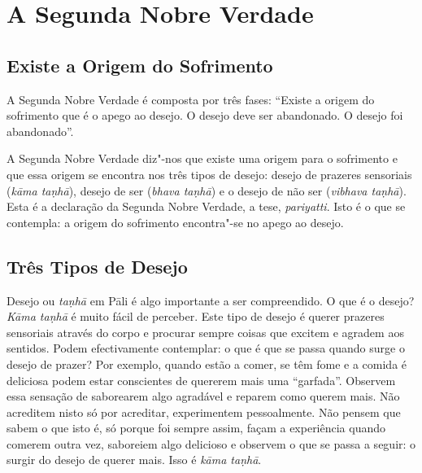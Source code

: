 
\chapter{A Segunda Nobre Verdade}

\section{Existe a Origem do Sofrimento}

A Segunda Nobre Verdade é composta por três fases: “Existe a origem do
sofrimento que é o apego ao desejo. O desejo deve ser abandonado. O desejo foi
abandonado”.

A Segunda Nobre Verdade diz"-nos que existe uma origem para o sofrimento e que
essa origem se encontra nos três tipos de desejo: desejo de prazeres sensoriais
(\emph{kāma taṇhā}), desejo de ser (\emph{bhava taṇhā}) e o desejo de não ser
(\emph{vibhava taṇhā}). Esta é a declaração da Segunda Nobre Verdade, a tese,
\emph{pariyatti}. Isto é o que se contempla: a origem do sofrimento encontra"-se
no apego ao desejo.

\section{Três Tipos de Desejo}

Desejo ou \emph{taṇhā} em Pāli é algo importante a ser compreendido. O que é o
desejo? \emph{Kāma taṇhā} é muito fácil de perceber. Este tipo de desejo é
querer prazeres sensoriais através do corpo e procurar sempre coisas que excitem
e agradem aos sentidos. Podem efectivamente contemplar: o que é que se passa
quando surge o desejo de prazer? Por exemplo, quando estão a comer, se têm fome
e a comida é deliciosa podem estar conscientes de quererem mais uma “garfada”.
Observem essa sensação de saborearem algo agradável e reparem como querem mais.
Não acreditem nisto só por acreditar, experimentem pessoalmente. Não pensem que
sabem o que isto é, só porque foi sempre assim, façam a experiência quando
comerem outra vez, saboreiem algo delicioso e observem o que se passa a seguir:
o surgir do desejo de querer mais. Isso é \emph{kāma taṇhā}.


